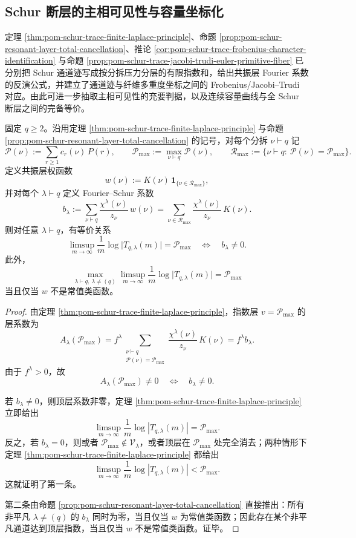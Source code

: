 \subsection{Schur 断层的主相可见性与容量坐标化}

定理 \ref{thm:pom-schur-trace-finite-laplace-principle}、命题 \ref{prop:pom-schur-resonant-layer-total-cancellation}、推论 \ref{cor:pom-schur-trace-frobenius-character-identification} 与命题 \ref{prop:pom-schur-trace-jacobi-trudi-euler-primitive-fiber} 已分别把 Schur 通道迹写成按分拆压力分层的有限指数和，给出共振层 Fourier 系数的反演公式，并建立了通道迹与纤维多重度坐标之间的 Frobenius/Jacobi--Trudi 对应。由此可进一步抽取主相可见性的充要判据，以及连续容量曲线与全 Schur 断层之间的完备等价。

\begin{theorem}\label{thm:derived-schur-top-layer-criterion}
固定 \(q\ge 2\)。沿用定理 \ref{thm:pom-schur-trace-finite-laplace-principle} 与命题 \ref{prop:pom-schur-resonant-layer-total-cancellation} 的记号，对每个分拆 \(\nu\vdash q\) 记
\[
\mathcal P(\nu):=\sum_{r\ge 1} c_r(\nu)\,P(r),
\qquad
\mathcal P_{\max}:=\max_{\nu\vdash q}\mathcal P(\nu),
\qquad
\mathcal R_{\max}:=\{\nu\vdash q:\ \mathcal P(\nu)=\mathcal P_{\max}\}.
\]
定义共振层权函数
\[
w(\nu):=K(\nu)\,\mathbf 1_{\{\nu\in\mathcal R_{\max}\}},
\]
并对每个 \(\lambda\vdash q\) 定义 Fourier--Schur 系数
\[
b_\lambda:=
\sum_{\nu\vdash q}\frac{\chi^\lambda(\nu)}{z_\nu}\,w(\nu)
=
\sum_{\nu\in\mathcal R_{\max}}\frac{\chi^\lambda(\nu)}{z_\nu}\,K(\nu).
\]
则对任意 \(\lambda\vdash q\)，有等价关系
\[
\limsup_{m\to\infty}\frac1m\log\bigl|T_{q,\lambda}(m)\bigr|
=
\mathcal P_{\max}
\quad\Longleftrightarrow\quad
b_\lambda\neq 0.
\]
此外，
\[
\max_{\lambda\vdash q,\ \lambda\neq(q)}
\limsup_{m\to\infty}\frac1m\log\bigl|T_{q,\lambda}(m)\bigr|
=
\mathcal P_{\max}
\]
当且仅当 \(w\) 不是常值类函数。
\end{theorem}
\begin{proof}
由定理 \ref{thm:pom-schur-trace-finite-laplace-principle}，指数层 \(v=\mathcal P_{\max}\) 的层系数为
\[
A_\lambda(\mathcal P_{\max})
=
f^\lambda
\sum_{\substack{\nu\vdash q\\ \mathcal P(\nu)=\mathcal P_{\max}}}
\frac{\chi^\lambda(\nu)}{z_\nu}\,K(\nu)
=
f^\lambda b_\lambda.
\]
由于 \(f^\lambda>0\)，故
\[
A_\lambda(\mathcal P_{\max})\neq 0
\quad\Longleftrightarrow\quad
b_\lambda\neq 0.
\]

若 \(b_\lambda\neq 0\)，则顶层系数非零，定理 \ref{thm:pom-schur-trace-finite-laplace-principle} 立即给出
\[
\limsup_{m\to\infty}\frac1m\log|T_{q,\lambda}(m)|=\mathcal P_{\max}.
\]
反之，若 \(b_\lambda=0\)，则或者 \(\mathcal P_{\max}\notin\mathcal V_\lambda\)，或者顶层在 \(\mathcal P_{\max}\) 处完全消去；两种情形下定理 \ref{thm:pom-schur-trace-finite-laplace-principle} 都给出
\[
\limsup_{m\to\infty}\frac1m\log|T_{q,\lambda}(m)|<\mathcal P_{\max}.
\]
这就证明了第一条。

第二条由命题 \ref{prop:pom-schur-resonant-layer-total-cancellation} 直接推出：所有非平凡 \(\lambda\neq(q)\) 的 \(b_\lambda\) 同时为零，当且仅当 \(w\) 为常值类函数；因此存在某个非平凡通道达到顶层指数，当且仅当 \(w\) 不是常值类函数。证毕。
\end{proof}
